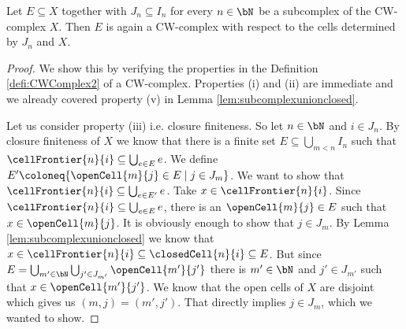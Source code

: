 \begin{lem}
    Let $E \subseteq X$ together with $J_n \subseteq I_n$ for every $n \in \bN$ be a subcomplex of the CW-complex $X$. 
    Then $E$ is again a CW-complex with respect to the cells determined by $J_n$ and $X$.
    \href{https://github.com/scholzhannah/CWComplexes/blob/7be4872a05b534011cc969eb5b80a4b7f0bf57e2/CWcomplexes/subcomplex.lean#L117-L174}{\faExternalLink}
\end{lem}
\begin{proof}
    We show this by verifying the properties in the Definition \ref{defi:CWComplex2} of a CW-complex. 
    Properties (i) and (ii) are immediate and we already covered property (v) in Lemma \ref{lem:subcomplexunionclosed}.

    Let us consider property (iii) i.e. closure finiteness. 
    So let $n \in \bN$ and $i \in J_n$. 
    By closure finiteness of $X$ we know that there is a finite set $E \subseteq \bigcup_{m < n} I_n$ such that $\cellFrontier{n}{i} \subseteq \bigcup_{e \in E}e$. 
    We define $E' \coloneq \{\openCell{m}{j} \in E \mid j \in J_m\}$. 
    We want to show that $\cellFrontier{n}{i} \subseteq \bigcup_{e \in E'}e$. 
    Take $x \in \cellFrontier{n}{i}$. 
    Since $\cellFrontier{n}{i} \subseteq \bigcup_{e \in E}e$, there is an $\openCell{m}{j} \in E$ such that $x \in \openCell{m}{j}$. 
    It is obviously enough to show that $j \in J_m$. 
    By Lemma \ref{lem:subcomplexunionclosed} we know that $x \in \cellFrontier{n}{i} \subseteq \closedCell{n}{i} \subseteq E$.
    But since $E = \bigcup_{m' \in \bN} \bigcup_{j' \in J_{m'}} \openCell{m'}{j'}$ there is $m' \in \bN$ and $j' \in J_{m'}$ such that $x \in \openCell{m'}{j'}$. 
    We know that the open cells of $X$ are disjoint which gives us $(m, j) = (m', j')$. 
    That directly implies $j \in J_m$, which we wanted to show. 


\end{proof}
